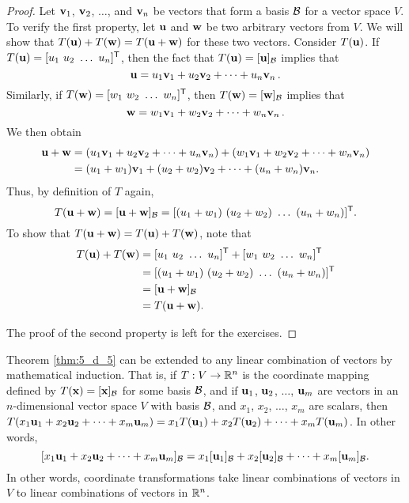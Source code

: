 \begin{proof} Let $\mathbf{v}_1$, $\mathbf{v}_2$, $\ldots$, and $\mathbf{v}_n$ be vectors that form a basis $\mathcal{B}$ for a vector space $V$. To verify the first property, let $\mathbf{u}$ and $\mathbf{w}$ be two arbitrary vectors from $V$. We will show that $T(\mathbf{u})+T(\mathbf{w}) = T(\mathbf{u} + \mathbf{w})$ for these two vectors. Consider $T(\mathbf{u})$. If $T(\mathbf{u})=[u_1 \ u_2 \ \ldots \ u_n]^{\mathsf{T}}$, then the fact that $T(\mathbf{u})= [\mathbf{u}]_{\mathcal{B}}$ implies that 
\[\mathbf{u} = u_1\mathbf{v}_1 + u_2\mathbf{v}_2 + \cdots + u_n \mathbf{v}_n \, . \]
Similarly, if $T(\mathbf{w})=[w_1 \ w_2 \ \ldots \ w_n]^{\mathsf{T}}$, then $T(\mathbf{w})=[\mathbf{w}]_{\mathcal{B}}$ implies that 
\[ \mathbf{w} = w_1\mathbf{v}_1 + w_2\mathbf{v}_2 + \cdots + w_n \mathbf{v}_n \, .\]
We then obtain
\begin{align*}
\mathbf{u}+\mathbf{w} &= (u_1\mathbf{v}_1 + u_2\mathbf{v}_2 + \cdots + u_n \mathbf{v}_n) + (w_1\mathbf{v}_1 + w_2\mathbf{v}_2 + \cdots + w_n \mathbf{v}_n) \\
	&= (u_1+w_1)\mathbf{v}_1 + (u_2+w_2)\mathbf{v}_2 + \cdots + (u_n+w_n) \mathbf{v}_n.
\end{align*}
Thus, by definition of $T$ again,
\[T(\mathbf{u}+\mathbf{w})= [\mathbf{u}+\mathbf{w}]_{\mathcal{B}} = [(u_1+w_1) \ (u_2+w_2) \ \ldots \ (u_n+w_n)]^{\mathsf{T}}.\]
To show that $T(\mathbf{u} + \mathbf{w}) = T(\mathbf{u}) + T(\mathbf{w})$, note that
\begin{align*}
T(\vu) + T(\vw) &= [u_1 \ u_2 \ \ldots \ u_n]^{\tr} + [w_1 \ w_2 \ \ldots \ w_n]^{\tr} \\
	&= [(u_1+w_1) \ (u_2+w_2) \  \ldots \ (u_n+w_n)]^{\tr} \\
	&= [\vu+\vw]_{\CB} \\
	&= T(\vu+\vw).
\end{align*}

The proof of the second property is left for the exercises. 

\end{proof}

Theorem \ref{thm:5_d_5} can be extended to any linear combination of vectors by mathematical induction. That is, if $T : V \to \mathbb{R}^n$ is the coordinate mapping defined by $T(\mathbf{x}) = [\mathbf{x}]_{\mathcal{B}}$ for some basis $\mathcal{B}$, and if $\mathbf{u}_1$, $\mathbf{u}_2$, $\ldots$, $\mathbf{u}_m$ are vectors in an $n$-dimensional vector space $V$ with basis $\mathcal{B}$, and $x_1$, $x_2$, $\ldots$, $x_m$ are scalars, then $T(x_1\mathbf{u}_1+x_2\mathbf{u}_2+\cdots +x_m\mathbf{u}_m) = x_1T(\mathbf{u}_1) + x_2T(\mathbf{u}_2) + \cdots + x_mT(\mathbf{u}_m)$.  In other words,
\[[x_1\mathbf{u}_1+x_2\mathbf{u}_2+\cdots + x_m\mathbf{u}_m]_{\mathcal{B}}  =  x_1[\mathbf{u}_1]_{\mathcal{B}} +  x_2[\mathbf{u}_2]_{\mathcal{B}} + \cdots +  x_m[\mathbf{u}_m]_{\mathcal{B}}.\]
In other words, coordinate transformations take linear combinations of vectors in $V$ to linear combinations of vectors in $\mathbb{R}^n$. 

